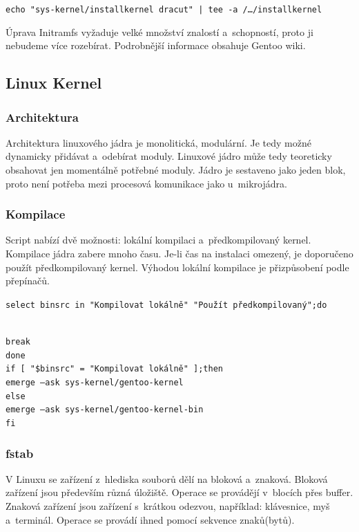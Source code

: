 \documentclass[12pt,a4paper,twoside,]{article}
\begin{document}
{{{{{{{\texttt{echo "sys-kernel/installkernel dracut" | tee -a /\dots/installkernel}

\hspace{-1.5em}Úprava {Initramfs} %
vyžaduje velké množství znalostí a~schopností, proto ji nebudeme více rozebírat. Podrobnější informace obsahuje Gentoo wiki. 


\subsection{\textsf{Linux Kernel}}
\subsubsection{\textsf{Architektura}}
Architektura linuxového jádra je monolitická, modulární. Je tedy možné dynamicky přidávat a~odebírat moduly. Linuxové jádro může tedy teoreticky obsahovat jen momentálně potřebné moduly. Jádro je sestaveno jako jeden blok, proto není potřeba mezi procesová komunikace jako u~mikrojádra. 
\subsubsection{\textsf{Kompilace}}
Script nabízí dvě možnosti: lokální kompilaci a~předkompilovaný kernel. Kompilace jádra zabere mnoho času. Je-li čas na instalaci omezený, je doporučeno použít předkompilovaný kernel. Výhodou lokální kompilace je přizpůsobení podle přepínačů. 

\hspace{-1.5em}\texttt{select binsrc in "Kompilovat lokálně" "Použít předkompilovaný";do}}\\
\hspace*{1.5em}\texttt{break}\\
\texttt{done}\\
\texttt{if [ "\$binsrc" = "Kompilovat lokálně" ];then}\\
\texttt{\hspace*{1.5em}emerge --ask sys-kernel/gentoo-kernel}\\
\texttt{else}\\
\texttt{\hspace*{1.5em}emerge --ask sys-kernel/gentoo-kernel-bin}\\
\texttt{fi}\\
\newpage
\subsubsection{\textsf{fstab}}
V Linuxu se zařízení z~hlediska souborů dělí na bloková a~znaková. Bloková zařízení jsou především různá úložiště. Operace se provádějí v~blocích přes buffer. Znaková zařízení jsou zařízení s~krátkou odezvou, například: klávesnice, myš a~terminál. Operace se provádí ihned pomocí sekvence znaků(bytů).

}}}}}}
\end{document}
